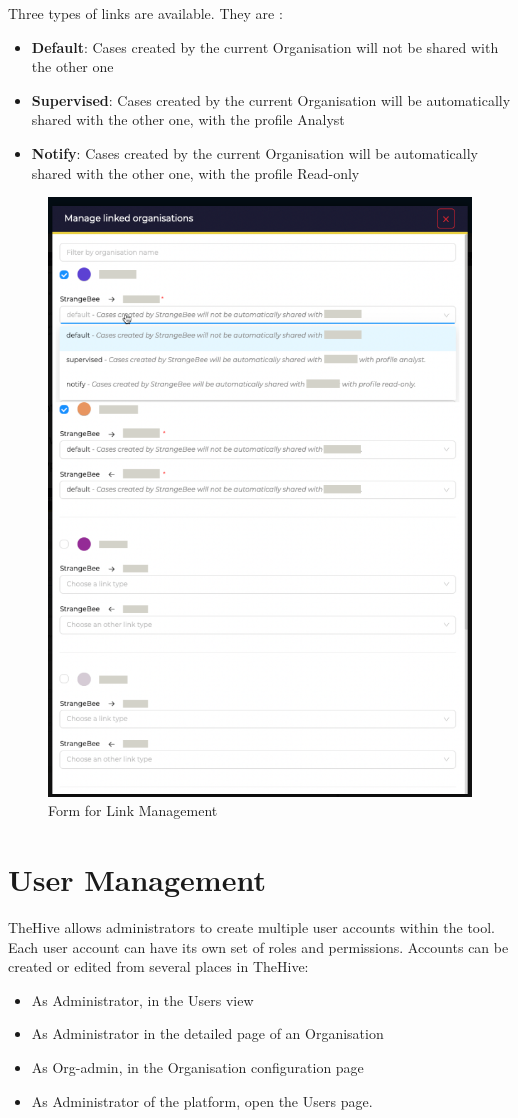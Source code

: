 \documentclass{book}
\begin{document}
Three types of links are available. They are :
\begin{itemize}
    \item \textbf{Default}: Cases created by the current Organisation will not be shared with the other one
    \item \textbf{Supervised}: Cases created by the current Organisation will be automatically shared with the other one, with the profile Analyst
    \item \textbf{Notify}: Cases created by the current Organisation will be automatically shared with the other one, with the profile Read-only
\end{itemize}
\newpage
\begin{figure}[h]
    \centering
    \includegraphics[width=0.7\linewidth]{Organization_images/form for link.png}
    \caption{Form for Link Management}
    \label{fig:linkmanage2}
\end{figure}

\newpage

\section{User Management}
TheHive allows administrators to create multiple user accounts within the tool. Each user account can have its own set of roles and permissions. Accounts can be created or edited from several places in TheHive:
\begin{itemize}
    \item As Administrator, in the Users view
    \item As Administrator in the detailed page of an Organisation
    \item As Org-admin, in the Organisation configuration page
    \item As Administrator of the platform, open the Users page.
\end{itemize}
\end{document}
